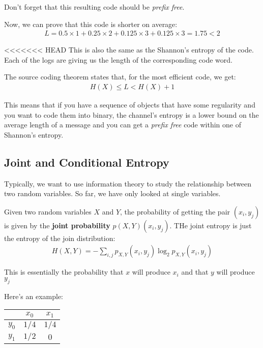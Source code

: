 \documentclass[11pt,a4paper,titlepage,dvipsnames,cmyk]{scrartcl}
\begin{document}
Don't forget that this resulting code should be \textit{prefix free}.

Now, we can prove that this code is shorter on average:
\begin{align*}
L = 0.5 \times 1 + 0.25 \times 2 + 0.125 \times 3 + 0.125 \times 3 = 1.75 < 2
\end{align*}

<<<<<<< HEAD
This is also the same as the Shannon's entropy of the code. Each of the logs are giving us the length of the corresponding code word.

The source coding theorem states that, for the most efficient code, we get:
\begin{align*}
H(X) \le L < H(X) + 1
\end{align*}

This means that if you have a sequence of objects that have some regularity and you want to code them into binary, the channel's entropy is a lower bound on the average length of a message and you can get a \textit{prefix free} code within one of Shannon's entropy.

\subsection{Joint and Conditional Entropy}
Typically, we want to use information theory to study the relationship between two random variables. So far, we have only looked at single variables.

\begin{tcolorbox} [space to upper,
collower=white,
title={Joint Entropy},
nobeforeafter,
halign lower=flush right, ]
Given two random variables $X$ and $Y$, the probability of getting the pair $(x_i, y_j)$ is given by the \textbf{joint probability} $p(X,Y) (x_i,y_j)$. THe joint entropy is just the entropy of the join distribution:
\begin{align*}
H(X,Y) = - \sum_{i,j}p_{X, Y}(x_i, y_j)\log_2p_{X,Y}(x_i,y_j)
\end{align*}

This is essentially the probability that $x$ will produce $x_i$ and that $y$ will produce $y_j$
\end{tcolorbox}

Here's an example:
\begin{center}
    \begin{tabular}{c|cc}
        & $x_0$ & $x_1$ \\ \midrule
        $y_0$ & $1/4$ & $1/4$ \\
        $y_1$ & $1/2$ & $0$
    \end{tabular}
\end{center}
\end{document}

